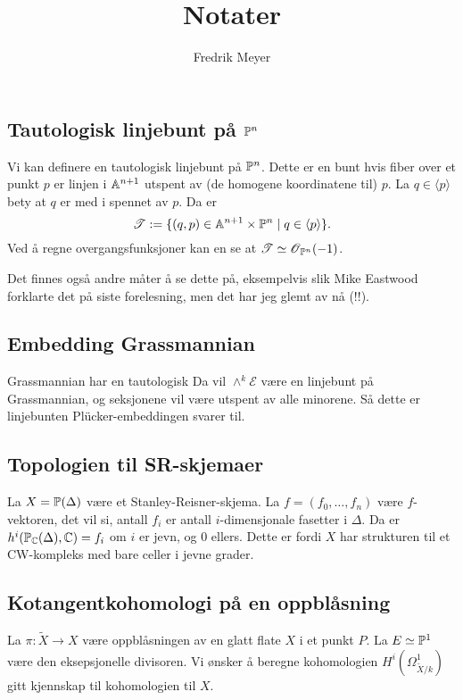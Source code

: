 \documentclass[11pt, norsk]{article}
\begin{document}
\title{Notater}
\author{Fredrik Meyer}
\maketitle 

\subsection{Tautologisk linjebunt på $\mathbb{P}^n$}

Vi kan definere en tautologisk linjebunt på $\mathbb{P}^n$. Dette er en bunt hvis fiber over et punkt $p$ er linjen i $\mathbb{A}^{n+1}$ utspent av (de homogene koordinatene til) $p$. La $q \in \langle p \rangle$ bety at $q$ er med i spennet av $p$. Da er
$$
\mathscr T := \{ (q,p) \in \mathbb{A}^{n+1} \times \mathbb{P}^n \mid q \in \langle p \rangle \}.
$$
Ved å regne overgangsfunksjoner kan en se at $\mathscr T \simeq \operatorname{\mathscr{O}}_{\mathbb{P}^n}(-1)$.

Det finnes også andre måter å se dette på, eksempelvis slik Mike Eastwood forklarte det på siste forelesning, men det har jeg glemt av nå (!!). 

\subsection{Embedding Grassmannian}

Grassmannian har en tautologisk 
Da vil $\wedge^k \mathscr E$ være en linjebunt på Grassmannian, og seksjonene vil være utspent av alle minorene. Så dette er linjebunten Plücker-embeddingen svarer til.

\subsection{Topologien til SR-skjemaer}

La $X=\mathbb{P}(\Delta)$ være et Stanley-Reisner-skjema. La $f=(f_0,\ldots,f_n)$ være $f$-vektoren, det vil si, antall $f_i$ er antall $i$-dimensjonale fasetter i $\Delta$. Da er $h^i(\mathbb{P}_{\mathbb{C}}(\Delta),\mathbb{C})=f_i$ om $i$ er jevn, og $0$ ellers. Dette er fordi $X$ har strukturen til et CW-kompleks med bare celler i jevne grader.

\subsection{Kotangentkohomologi på en oppblåsning}

La $\pi:\widetilde X \to X$ være oppblåsningen av en glatt flate $X$ i et punkt $P$. La $E \simeq \mathbb{P}^1$ være den eksepsjonelle divisoren. Vi ønsker å beregne kohomologien $H^i(\Omega_{\widetilde X/k}^1)$ gitt kjennskap til kohomologien til $X$.
\end{document}
